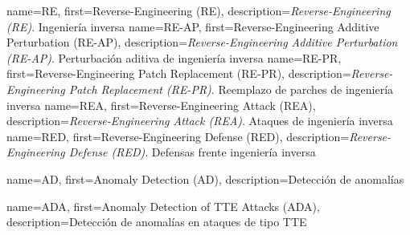        {name={RE},     first={Reverse-Engineering (RE)},                           description={\textit{Reverse-Engineering (RE)}. Ingeniería inversa}}
    {name={RE-AP},  first={Reverse-Engineering Additive Perturbation (RE-AP)},  description={\textit{Reverse-Engineering Additive Perturbation (RE-AP)}. Perturbación aditiva de ingeniería inversa}}
    {name={RE-PR},  first={Reverse-Engineering Patch Replacement (RE-PR)},      description={\textit{Reverse-Engineering Patch Replacement (RE-PR)}. Reemplazo de parches de ingeniería inversa}}
      {name={REA},    first={Reverse-Engineering Attack (REA)},                   description={\textit{Reverse-Engineering Attack (REA)}. Ataques de ingeniería inversa}}
      {name={RED},    first={Reverse-Engineering Defense (RED)},                  description={\textit{Reverse-Engineering Defense (RED)}. Defensas frente ingeniería inversa}}



 {name={AD}, first={Anomaly Detection (AD)}, description={Detección de anomalías}}

 {name={ADA}, first={Anomaly Detection of TTE Attacks (ADA)}, description={Detección de anomalías en ataques de tipo TTE}}

